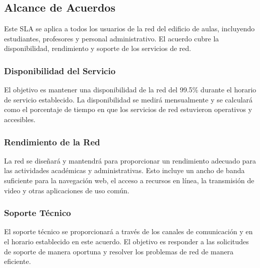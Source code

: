 \subsection{Alcance de Acuerdos}

Este SLA se aplica a todos los usuarios de la red del edificio de aulas, incluyendo estudiantes, profesores y personal administrativo. El acuerdo cubre la disponibilidad, rendimiento y soporte de los servicios de red.

\subsubsection{Disponibilidad del Servicio}
El objetivo es mantener una disponibilidad de la red del 99.5\% durante el horario de servicio establecido. La disponibilidad se medirá mensualmente y se calculará como el porcentaje de tiempo en que los servicios de red estuvieron operativos y accesibles.

\subsubsection{Rendimiento de la Red}
La red se diseñará y mantendrá para proporcionar un rendimiento adecuado para las actividades académicas y administrativas. Esto incluye un ancho de banda suficiente para la navegación web, el acceso a recursos en línea, la transmisión de video y otras aplicaciones de uso común.

\subsubsection{Soporte Técnico}
El soporte técnico se proporcionará a través de los canales de comunicación y en el horario establecido en este acuerdo. El objetivo es responder a las solicitudes de soporte de manera oportuna y resolver los problemas de red de manera eficiente.
